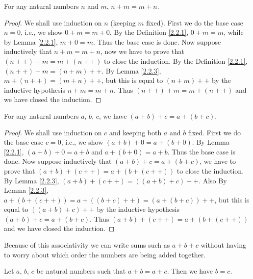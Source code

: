 \begin{proposition}\label{2.2.4}
    For any natural numbers \(n\) and \(m\), \(n + m = m + n\).
\end{proposition}

\begin{proof}
    We shall use induction on \(n\) (keeping \(m\) fixed).
    First we do the base case \(n = 0\), i.e., we show \(0 + m = m + 0\).
    By the Definition \ref{2.2.1}, \(0 + m = m\), while by Lemma \ref{2.2.1}, \(m + 0 = m\).
    Thus the base case is done.
    Now suppose inductively that \(n + m = m + n\), now we have to prove that \((n++) + m = m + (n++)\) to close the induction.
    By the Definition \ref{2.2.1}, \((n++) + m = (n + m)++\).
    By Lemma \ref{2.2.3}, \(m + (n++) = (m + n)++\), but this is equal to \((n + m)++\) by the inductive hypothesis \(n+m=m+n\).
    Thus \((n++) + m = m + (n++)\) and we have closed the induction.
\end{proof}

\begin{proposition}\label{2.2.5}
    For any natural numbers \(a\), \(b\), \(c\), we have \((a + b) + c = a + (b + c)\).
\end{proposition}

\begin{proof}
    We shall use induction on \(c\) and keeping both \(a\) and \(b\) fixed.
    First we do the base case \(c = 0\), i.e., we show \((a + b) + 0 = a + (b + 0)\).
    By Lemma \ref{2.2.1}, \((a + b) + 0 = a + b\) and \(a + (b + 0) = a + b\).
    Thus the base case is done.
    Now suppose inductively that \((a + b) + c = a + (b + c)\), we have to prove that \((a + b) + (c++) = a + (b + (c++))\) to close the induction.
    By Lemma \ref{2.2.3}, \((a + b) + (c++) = ((a + b) + c)++\).
    Also By Lemma \ref{2.2.3}, \(a + (b + (c++)) = a + ((b + c)++) = (a + (b + c))++\), but this is equal to \(((a + b) + c)++\) by the inductive hypothesis \((a + b) + c = a + (b + c)\).
    Thus \((a + b) + (c++) = a + (b + (c++))\) and we have closed the induction.
\end{proof}

\begin{note}
    Because of this associativity we can write sums such as \(a + b + c\) without having to worry about which order the numbers are being added together.
\end{note}

\begin{proposition}\label{2.2.6}
    Let \(a\), \(b\), \(c\) be natural numbers such that \(a + b = a + c\).
    Then we have \(b = c\).
\end{proposition}


